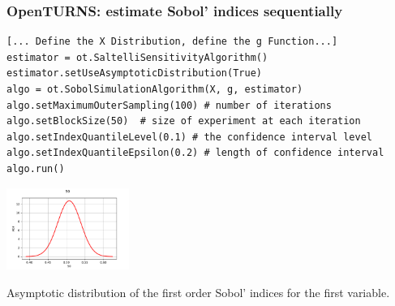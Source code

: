 \documentclass{beamer}
\begin{document}






\begin{frame}[containsverbatim]
\frametitle{OpenTURNS: estimate Sobol' indices sequentially}

\scriptsize{

\lstset{language=python}
\begin{lstlisting}
[... Define the X Distribution, define the g Function...]
estimator = ot.SaltelliSensitivityAlgorithm()
estimator.setUseAsymptoticDistribution(True)
algo = ot.SobolSimulationAlgorithm(X, g, estimator)
algo.setMaximumOuterSampling(100) # number of iterations
algo.setBlockSize(50)  # size of experiment at each iteration
algo.setIndexQuantileLevel(0.1) # the confidence interval level
algo.setIndexQuantileEpsilon(0.2) # length of confidence interval
algo.run()
\end{lstlisting}

}

	\begin{center}
	\includegraphics[width=0.3\textwidth]{figures/S0-distribution.pdf}
	\end{center}
Asymptotic distribution of the first order Sobol' indices for the first variable.

\end{frame}
\end{document}
